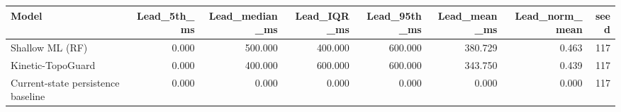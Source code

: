 \begin{tabular}{lrrrrrrr}
\toprule
Model & Lead\_5th\_ms & Lead\_median\_ms & Lead\_IQR\_ms & Lead\_95th\_ms & Lead\_mean\_ms & Lead\_norm\_mean & seed \\
\midrule
Shallow ML (RF) & 0.000 & 500.000 & 400.000 & 600.000 & 380.729 & 0.463 & 117 \\
Kinetic-TopoGuard & 0.000 & 400.000 & 600.000 & 600.000 & 343.750 & 0.439 & 117 \\
Current-state persistence baseline & 0.000 & 0.000 & 0.000 & 0.000 & 0.000 & 0.000 & 117 \\
\bottomrule
\end{tabular}